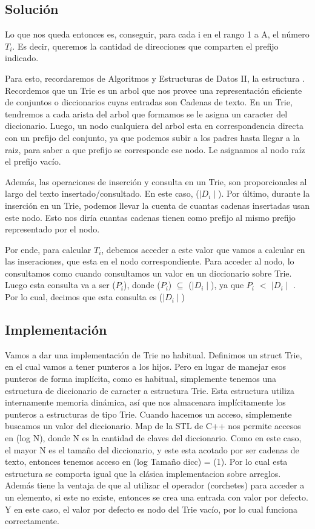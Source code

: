 \subsection{Solución}
\par{Lo que nos queda entonces es, conseguir, para cada i en el rango 1 a A, el número $T_i$.
Es decir, queremos la cantidad de direcciones que comparten el prefijo indicado.}
\par{Para esto, recordaremos de Algoritmos y Estructuras de Datos II, la estructura .
Recordemos que un Trie es un arbol que nos provee una representación eficiente de conjuntos o diccionarios cuyas entradas son Cadenas de texto. En un Trie, tendremos a cada arista del arbol que formamos se le asigna un caracter del diccionario. Luego, un nodo cualquiera del arbol esta en correspondencia directa con un prefijo del conjunto, ya que podemos subir a los padres hasta llegar a la raiz, para saber a que prefijo se corresponde ese nodo. Le asignamos al nodo raíz el prefijo vacío.}
\par{Además, las operaciones de inserción y consulta en un Trie, son proporcionales al largo del texto
insertado/consultado. En este caso, \bigo($\mid D_i \mid$). Por último, durante la inserción en un Trie, podemos llevar la cuenta de cuantas cadenas insertadas usan este nodo. Esto nos diría cuantas cadenas
tienen como prefijo al mismo prefijo representado por el nodo.}
\par{Por ende, para calcular $T_i$, debemos acceder a este valor que vamos a calcular en las inseraciones, que esta en el nodo correspondiente. Para acceder al nodo, lo consultamos como cuando consultamos un valor en un diccionario sobre Trie. Luego esta consulta va a ser \bigo($P_i$), donde
\bigo($P_i$) $\subseteq$ \bigo($\mid D_i \mid$), ya que $P_i$ $<$ $\mid D_i \mid$ . Por lo cual, decimos que esta consulta es \bigo($\mid D_i \mid$)}

\subsection{Implementación}
Vamos a dar una implementación de Trie no habitual. Definimos un struct Trie, en el cual
vamos a tener punteros a los hijos. Pero en lugar de manejar esos punteros de forma implícita, 
como es habitual, simplemente tenemos una estructura de diccionario de caracter a estructura Trie.
Esta estructura utiliza internamente memoria dinámica, así que nos almacenara implícitamente 
los punteros a estructuras de tipo Trie. Cuando hacemos un acceso, simplemente buscamos un valor
del diccionario. Map de la STL de C++ nos permite accesos en \bigo(log N), donde N es la cantidad de claves del diccionario. Como en este caso, el mayor N es el tamaño del diccionario, y este esta
acotado por ser cadenas de texto, entonces tenemos acceso en \bigo(log Tamaño dicc) = \bigo(1).
Por lo cual esta estructura se comporta igual que la clásica implementacion sobre arreglos.
Además tiene la ventaja de que al utilizar el operador \quotes{[]}(corchetes) para acceder a un elemento, si este no existe, entonces se crea una entrada con valor por defecto. Y en este caso, 
el valor por defecto es nodo del Trie vacío, por lo cual funciona correctamente.


